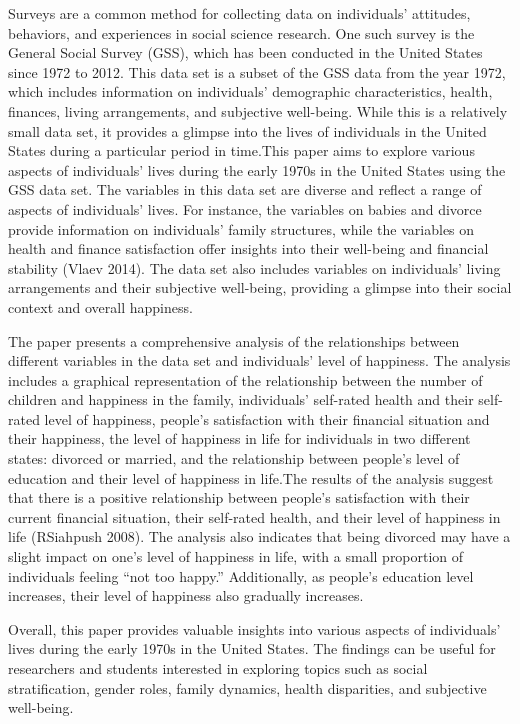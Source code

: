 \documentclass[
  letterpaper,
  DIV=11,
  numbers=noendperiod]{scrartcl}
\begin{document}
Surveys are a common method for collecting data on individuals'
attitudes, behaviors, and experiences in social science research. One
such survey is the General Social Survey (GSS), which has been conducted
in the United States since 1972 to 2012. This data set is a subset of
the GSS data from the year 1972, which includes information on
individuals' demographic characteristics, health, finances, living
arrangements, and subjective well-being. While this is a relatively
small data set, it provides a glimpse into the lives of individuals in
the United States during a particular period in time.This paper aims to
explore various aspects of individuals' lives during the early 1970s in
the United States using the GSS data set. The variables in this data set
are diverse and reflect a range of aspects of individuals' lives. For
instance, the variables on babies and divorce provide information on
individuals' family structures, while the variables on health and
finance satisfaction offer insights into their well-being and financial
stability (Vlaev 2014). The data set also includes variables on
individuals' living arrangements and their subjective well-being,
providing a glimpse into their social context and overall happiness.

The paper presents a comprehensive analysis of the relationships between
different variables in the data set and individuals' level of happiness.
The analysis includes a graphical representation of the relationship
between the number of children and happiness in the family, individuals'
self-rated health and their self-rated level of happiness, people's
satisfaction with their financial situation and their happiness, the
level of happiness in life for individuals in two different states:
divorced or married, and the relationship between people's level of
education and their level of happiness in life.The results of the
analysis suggest that there is a positive relationship between people's
satisfaction with their current financial situation, their self-rated
health, and their level of happiness in life (RSiahpush 2008). The
analysis also indicates that being divorced may have a slight impact on
one's level of happiness in life, with a small proportion of individuals
feeling ``not too happy.'' Additionally, as people's education level
increases, their level of happiness also gradually increases.

Overall, this paper provides valuable insights into various aspects of
individuals' lives during the early 1970s in the United States. The
findings can be useful for researchers and students interested in
exploring topics such as social stratification, gender roles, family
dynamics, health disparities, and subjective well-being.
\end{document}

